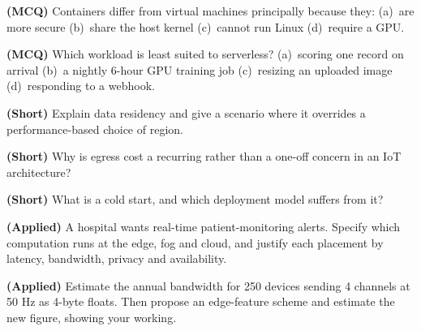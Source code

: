 \begin{reviewq}
  \item \textbf{(MCQ)} Containers differ from virtual machines principally because
        they: (a)~are more secure (b)~share the host kernel (c)~cannot run Linux
        (d)~require a GPU.
  \item \textbf{(MCQ)} Which workload is least suited to serverless? (a)~scoring one
        record on arrival (b)~a nightly 6-hour GPU training job (c)~resizing an
        uploaded image (d)~responding to a webhook.
  \item \textbf{(Short)} Explain data residency and give a scenario where it
        overrides a performance-based choice of region.
  \item \textbf{(Short)} Why is egress cost a recurring rather than a one-off
        concern in an IoT architecture?
  \item \textbf{(Short)} What is a cold start, and which deployment model suffers
        from it?
  \item \textbf{(Applied)} A hospital wants real-time patient-monitoring alerts.
        Specify which computation runs at the edge, fog and cloud, and justify each
        placement by latency, bandwidth, privacy and availability.
  \item \textbf{(Applied)} Estimate the annual bandwidth for 250 devices sending
        4 channels at 50 Hz as 4-byte floats. Then propose an edge-feature scheme
        and estimate the new figure, showing your working.
\end{reviewq}
